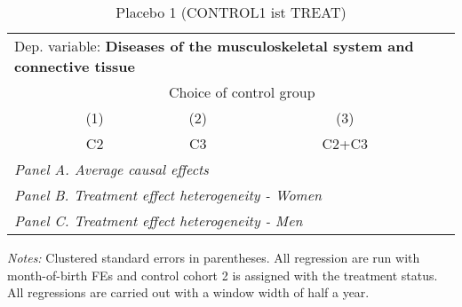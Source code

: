  \begin{table}[H] \centering \begin{threeparttable} \caption{Placebo 1 (CONTROL1 ist TREAT) } {\def\sym#1{\ifmmode^{#1}\else\(^{#1}\)\fi} \begin{tabular}{l*{4}{c}} \toprule \multicolumn{4}{l}{Dep. variable: \textbf{Diseases of the musculoskeletal system and connective tissue}} \\ & \multicolumn{3}{c}{Choice of control group} \\ \cmidrule(lr){2-4}
            &\multicolumn{1}{c}{(1)}&\multicolumn{1}{c}{(2)}&\multicolumn{1}{c}{(3)}\\
            &\multicolumn{1}{c}{C2}&\multicolumn{1}{c}{C3}&\multicolumn{1}{c}{C2+C3}\\
\midrule
 \multicolumn{4}{l}{\emph{Panel A. Average causal effects}} \\      \midrule\multicolumn{4}{l}{\emph{Panel B. Treatment effect heterogeneity - Women}} \\      \midrule\multicolumn{4}{l}{\emph{Panel C. Treatment effect heterogeneity - Men}} \\      
\bottomrule \end{tabular} } \begin{tablenotes} \item \scriptsize \emph{Notes:} Clustered standard errors in parentheses. All regression are run with month-of-birth FEs and control cohort 2 is assigned with the treatment status. All regressions are carried out with a window width of half a year. \end{tablenotes} \end{threeparttable} \end{table} 
